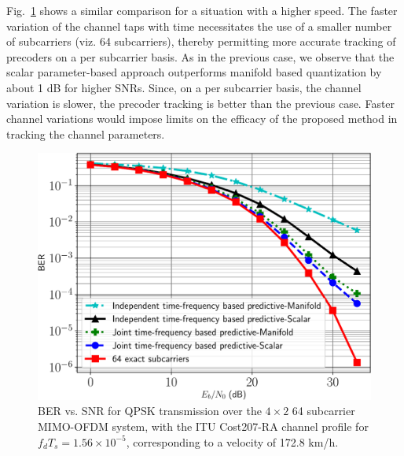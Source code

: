 \documentclass[journal,10pt,twocolumn]{IEEEtran}
\begin{document}
Fig.~\ref{fig:ber_veh} shows a similar comparison for a situation with
a higher speed. The faster variation of the channel taps with time
necessitates the use of a smaller number of subcarriers (viz. 64
subcarriers), thereby permitting more accurate tracking of precoders
on a per subcarrier basis. As in the previous case, we observe that
the scalar parameter-based approach outperforms manifold based
quantization by about 1 dB for higher SNRs. Since, on a per subcarrier
basis, the channel variation is slower, the precoder tracking is
better than the previous case. Faster channel variations would impose
limits on the efficacy of the proposed method in tracking the channel
parameters.
\begin{figure}
\begin{center}
\includegraphics[width=0.71\columnwidth]{images/64final_withtime}
\caption{BER vs. SNR for QPSK transmission over the $4\times 2$ 64
  subcarrier MIMO-OFDM system, with the ITU Cost207-RA channel profile
  for $f_dT_s = 1.56\times 10^{-5}$, corresponding to a velocity of 172.8 km/h.}
\label{fig:ber_veh}
\end{center}
\end{figure}


\end{document}

